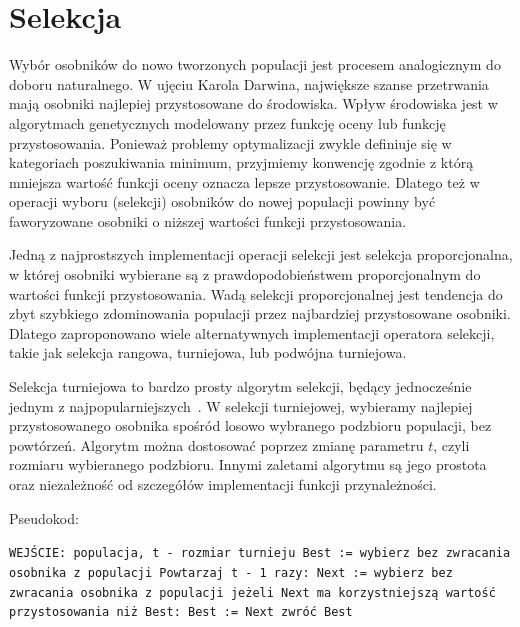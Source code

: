 \documentclass[brudnopis]{xmgr}
\begin{document}
\section{Selekcja}

Wybór osobników do nowo tworzonych populacji jest procesem analogicznym do doboru naturalnego. W ujęciu Karola Darwina, największe szanse przetrwania mają osobniki najlepiej przystosowane do środowiska. Wpływ środowiska jest w algorytmach genetycznych modelowany przez funkcję oceny lub funkcję przystosowania. Ponieważ problemy optymalizacji zwykle definiuje się w kategoriach poszukiwania minimum, przyjmiemy konwencję zgodnie z którą mniejsza wartość funkcji oceny oznacza lepsze przystosowanie. Dlatego też w operacji wyboru (selekcji) osobników do nowej populacji powinny być faworyzowane osobniki o niższej wartości funkcji przystosowania.

Jedną z najprostszych implementacji operacji selekcji jest selekcja proporcjonalna, w której osobniki wybierane są z prawdopodobieństwem proporcjonalnym do wartości funkcji przystosowania. Wadą selekcji proporcjonalnej jest tendencja do zbyt szybkiego zdominowania populacji przez najbardziej przystosowane osobniki. Dlatego zaproponowano wiele alternatywnych implementacji operatora selekcji, takie jak selekcja rangowa, turniejowa, lub podwójna turniejowa.

Selekcja turniejowa to bardzo prosty algorytm selekcji, będący jednocześnie jednym z najpopularniejszych~\cite{Luke2009Metaheuristics}. W selekcji turniejowej, wybieramy najlepiej przystosowanego osobnika spośród losowo wybranego podzbioru populacji, bez powtórzeń. Algorytm można dostosować poprzez zmianę parametru $t$, czyli rozmiaru wybieranego podzbioru. Innymi zaletami algorytmu są jego prostota oraz niezależność od szczegółów implementacji funkcji przynależności.

Pseudokod:\newline

\noindent
\texttt{WEJŚCIE: populacja, t - rozmiar turnieju\newline
Best := wybierz bez zwracania osobnika z populacji\newline
Powtarzaj t - 1 razy:\newline
\indent Next := wybierz bez zwracania osobnika z populacji\newline
\indent jeżeli Next ma korzystniejszą wartość przystosowania niż Best:\newline
\indent\indent Best := Next\newline
zwróć Best\newline
}
\end{document}
